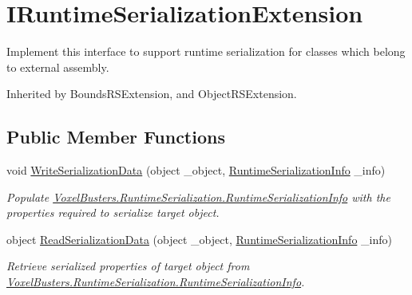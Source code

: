 \hypertarget{interface_voxel_busters_1_1_runtime_serialization_1_1_i_runtime_serialization_extension}{}\section{I\+Runtime\+Serialization\+Extension}
\label{interface_voxel_busters_1_1_runtime_serialization_1_1_i_runtime_serialization_extension}


Implement this interface to support runtime serialization for classes which belong to external assembly.  




Inherited by Bounds\+R\+S\+Extension, and Object\+R\+S\+Extension.

\subsection*{Public Member Functions}
\begin{DoxyCompactItemize}
\item 
void \hyperlink{interface_voxel_busters_1_1_runtime_serialization_1_1_i_runtime_serialization_extension_aad6284d5fa589cb9ec565d0f6a64d822}{Write\+Serialization\+Data} (object \+\_\+object, \hyperlink{class_voxel_busters_1_1_runtime_serialization_1_1_runtime_serialization_info}{Runtime\+Serialization\+Info} \+\_\+info)
\begin{DoxyCompactList}\small\item\em Populate \hyperlink{class_voxel_busters_1_1_runtime_serialization_1_1_runtime_serialization_info}{Voxel\+Busters.\+Runtime\+Serialization.\+Runtime\+Serialization\+Info} with the properties required to serialize target object. \end{DoxyCompactList}\item 
object \hyperlink{interface_voxel_busters_1_1_runtime_serialization_1_1_i_runtime_serialization_extension_ad7cbc4dec1138fee757be8e783e4f323}{Read\+Serialization\+Data} (object \+\_\+object, \hyperlink{class_voxel_busters_1_1_runtime_serialization_1_1_runtime_serialization_info}{Runtime\+Serialization\+Info} \+\_\+info)
\begin{DoxyCompactList}\small\item\em Retrieve serialized properties of target object from \hyperlink{class_voxel_busters_1_1_runtime_serialization_1_1_runtime_serialization_info}{Voxel\+Busters.\+Runtime\+Serialization.\+Runtime\+Serialization\+Info}. \end{DoxyCompactList}\end{DoxyCompactItemize}


